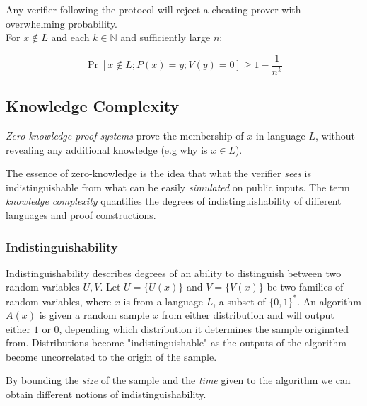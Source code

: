 Any verifier following the protocol will reject a cheating prover with overwhelming probability.\\
For $x \notin L$ and each $k \in \mathbb{N}$ and sufficiently large $n$;

$$\Pr[x \notin L; P(x) = y; V(y) = 0] \ge 1 - \frac{1}{n^k}$$

\subsection{Knowledge Complexity}

\textit{Zero-knowledge proof systems} prove the  membership of $x$ in language $L$, without revealing any additional knowledge (e.g why is $x \in L$).

The essence of zero-knowledge is the idea that what the verifier \textit{sees} is indistinguishable from what can be easily \textit{simulated} on public inputs.
The term \textit{knowledge complexity} quantifies the degrees of indistinguishability of different languages and proof constructions. 

\subsubsection{Indistinguishability}
Indistinguishability describes degrees of an ability to distinguish between two random variables $U, V$.
\bigskip
\newline
Let $U = \{U(x)\}$ and $V = \{V(x)\}$ be two families of random variables, where $x$ is from a language $L$, a subset of $\{0, 1\}^*$.
\newline
An algorithm $A(x)$ is given a random sample $x$ from either distribution and will output either $1$ or $0$, depending which distribution it determines the sample originated from.
Distributions become "indistinguishable" as the outputs of the algorithm become uncorrelated to the origin of the sample.

By bounding the \textit{size} of the sample and the \textit{time} given to the algorithm we can obtain different notions of indistinguishability.

%
%
%


